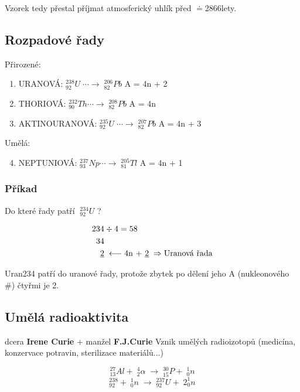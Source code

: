 Vzorek tedy přestal příjmat atmosferický uhlík před $\doteq$2866lety.

\TabPositions{0em, 15em, 30em}
\subsection{Rozpadové řady}
Přirozené:
\begin{enumerate}
    \item URANOVÁ: \tab $^{238}_{92}U \; \cdots \longrightarrow \; ^{206}_{82}Pb$ \tab A = 4n + 2
    \item THORIOVÁ: \tab $^{232}_{90}Th \cdots \longrightarrow \; ^{208}_{82}Pb$ \tab A = 4n
    \item AKTINOURANOVÁ: \tab $^{235}_{92}U \; \cdots \longrightarrow \; ^{207}_{82}Pb$ \tab A = 4n + 3 
\end{enumerate}

Umělá:
\begin{enumerate}
    \setcounter{enumi}{3}
    \item NEPTUNIOVÁ: \tab $^{237}_{93}Np \cdots \longrightarrow \; ^{205}_{81}Tl$ \tab A = 4n + 1
\end{enumerate}

\subsubsection*{Příkad}
Do které řady patří $\; ^{234}_{92}U$ ?

\begin{align*}
    234&\div 4 = 58 \\
    34& \\
    \underline{2}& \; \longleftarrow \mbox{4n + \underline{2}} \; \Rightarrow \mbox{Uranová řada}\\
\end{align*}

Uran234 patří do uranové řady, protože zbytek po dělení jeho A (nukleonového \#) čtyřmi je 2.

\subsection{Umělá radioaktivita}
dcera \textbf{Irene Curie} + manžel \textbf{F.J.Curie}
Vznik umělých radioizotopů (medicína, konzervace potravin, sterilizace materiálů...)

\[^{27}_{13}Al + \; ^4_2\alpha \; \longrightarrow \; ^{30}_{15}P + \; ^1_0n\]
\vspace{1em}
\[^{238}_{92} +  \; ^1_0n \; \longrightarrow \; ^{237}_{92}U + \; 2^1_0n\]
\vspace{0.5em}

